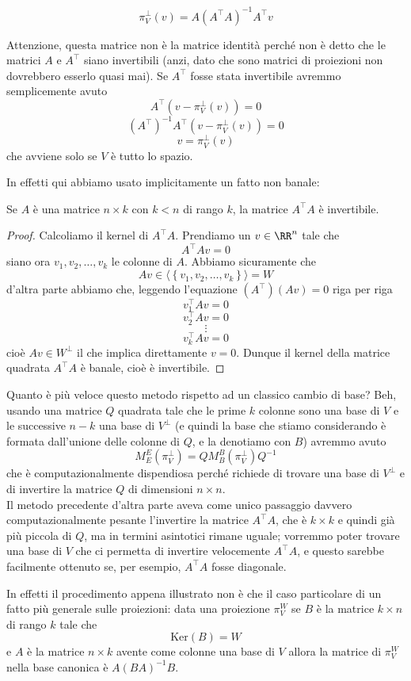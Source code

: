 \documentclass[11pt]{scrartcl}
\renewcommand{\ker}[1]{\text{Ker}\left(#1\right)}
\begin{document}
   	 $$\pi_V^\perp(v)=A\left(A^\intercal A\right)^{-1}A^\intercal v$$ 
   	 \begin{remark}
   	 	Attenzione, questa matrice non è la matrice identità perché non è detto che le matrici $A$ e $A^\intercal$ siano invertibili (anzi, dato che sono matrici di proiezioni non dovrebbero esserlo quasi mai). Se $A^\intercal$ fosse stata invertibile avremmo semplicemente avuto 
   	 	$$A^\intercal\left(v-\pi_V^\perp(v)\right)=0$$
   	 	$$\left(A^\intercal\right)^{-1}A^\intercal\left(v-\pi_V^\perp(v)\right)=0$$
   	 	$$v=\pi_V^\perp(v)$$
   	 	che avviene solo se $V$ è tutto lo spazio.
   	 \end{remark}
   	 
   	 In effetti qui abbiamo usato implicitamente un fatto non banale:
   	 \begin{lemma}
   	 	Se $A$ è una matrice $n\times k$  con $k<n$ di rango $k$, la matrice $A^\intercal A$ è invertibile.
   	 \end{lemma}
   	 \begin{proof}
   	 	Calcoliamo il kernel di $A^\intercal A$. Prendiamo un $v\in\RR^n$ tale che
   	 	$$A^\intercal A v=0$$
   	 	siano ora $v_1,v_2,\dots,v_k$ le colonne di $A$. Abbiamo sicuramente che 
   	 	$$Av\in \langle \left\{v_1,v_2,\dots,v_k\right\}\rangle=W$$
   	 	d'altra parte abbiamo che, leggendo l'equazione $(A^\intercal)(Av)=0$ riga per riga
   	 	$$v_1^\intercal Av=0$$
   	 	$$v_2^\intercal Av=0$$
   	 	$$\vdots$$
   	 	$$v_k^\intercal Av=0$$
   	 	cioè $Av\in W^\perp$ il che implica direttamente $v=0$. Dunque il kernel della matrice quadrata $A^\intercal A$ è banale, cioè è invertibile. 
   	 \end{proof}
   	 
   	 Quanto è più veloce questo metodo rispetto ad un classico cambio di base? Beh, usando una matrice $Q$ quadrata tale che le prime $k$ colonne sono una base di $V$ e le successive $n-k$ una base di $V^\perp$ (e quindi la base che stiamo considerando è formata dall'unione delle colonne di $Q$, e la denotiamo con $B$) avremmo avuto
   	 $$M_{E}^{E}(\pi_V^\perp)=QM_B^B(\pi_V^\perp)Q^{-1}$$
   	 che è computazionalmente dispendiosa perché richiede di trovare una base di $V^\perp$ e di invertire la matrice $Q$ di dimensioni $n\times n$. 	\\
   	 Il metodo precedente d'altra parte aveva come unico passaggio davvero computazionalmente pesante l'invertire la matrice $A^\intercal A$, che è $k\times k$ e quindi già più piccola di $Q$, ma in termini asintotici rimane uguale; vorremmo poter trovare una base di $V$ che ci permetta di invertire velocemente $A^\intercal A$, e questo sarebbe facilmente ottenuto se, per esempio, $A^\intercal A$ fosse diagonale.   
   	 \begin{remark}
   	 	In effetti il procedimento appena illustrato non è che il caso particolare di un fatto più generale sulle proiezioni: data una proiezione $\pi^W_V$ se $B$ è la matrice  $k\times n$ di rango $k$ tale che
   	 	$$\ker{B}=W$$
   	 	e $A$ è la matrice $n\times k$ avente come colonne una base di $V$ allora la matrice di $\pi_V^W$ nella base canonica è $A(BA)^{-1}B$.
   	 \end{remark}	 
\end{document}

